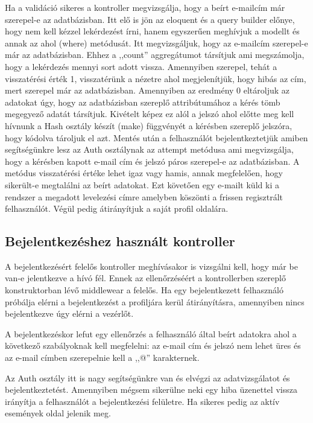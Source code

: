 \documentclass[
]{thesis-ekf}
\theoremstyle{definition}
\theoremstyle{remark}
\begin{document}
Ha a validáció sikeres a kontroller megvizsgálja, hogy a beírt e-mailcím már szerepel-e az adatbázisban. Itt elő is jön az eloquent és a query builder előnye, hogy nem kell kézzel lekérdezést írni, hanem egyszerűen meghívjuk a modellt és annak az ahol (where) metódusát. Itt megvizsgáljuk, hogy az e-mailcím szerepel-e már az adatbázisban. Ehhez a ,,count'' aggregátumot társítjuk ami megszámolja, hogy a lekérdezés mennyi sort adott vissza. Amennyiben szerepel, tehát a visszatérési érték 1, visszatérünk a nézetre ahol megjelenítjük, hogy hibás az cím, mert szerepel már az adatbázisban. Amennyiben az eredmény 0 eltároljuk az adatokat úgy, hogy az adatbázisban szereplő attribútumához a kérés tömb megegyező adatát társítjuk. Kivételt képez ez alól a jelszó ahol előtte meg kell hívnunk a Hash osztály készít (make) függvényét a kérésben szereplő jelszóra, hogy kódolva tároljuk el azt. Mentés után a felhasználót bejelentkeztetjük amiben segítségünkre lesz az Auth osztálynak az attempt metódusa ami megvizsgálja, hogy a kérésben kapott e-mail cím és jelszó páros szerepel-e az adatbázisban. A metódus visszatérési értéke lehet igaz vagy hamis, annak megfelelően, hogy sikerült-e megtalálni az beírt adatokat. Ezt követően egy e-mailt küld ki a rendszer a megadott levelezési címre amelyben köszönti a frissen regisztrált felhasználót. Végül pedig átirányítjuk a saját profil oldalára.

\subsection{Bejelentkezéshez használt kontroller}
A bejelentkezésért felelős kontroller meghívásakor is vizsgálni kell, hogy már be van-e jelentkezve a hívó fél. Ennek az ellenőrzéséért a kontrollerben szereplő konstruktorban lévő middlewear a felelős. Ha egy bejelentkezett felhasználó próbálja elérni a bejelentkezést a profiljára kerül átirányításra, amennyiben nincs bejelentkezve úgy elérni a vezérlőt.

A bejelentkezéskor lefut egy ellenőrzés a felhasználó által beírt adatokra ahol a következő szabályoknak kell megfelelni: az e-mail cím és jelszó nem lehet üres és az e-mail címben szerepelnie kell a ,,@'' karakternek.

Az Auth osztály itt is nagy segítségünkre van és elvégzi az adatvizsgálatot és bejelentkeztetést. Amennyiben mégsem sikerülne neki egy hiba üzenettel vissza irányítja a felhasználót a bejelentkezési felületre. Ha sikeres pedig az aktív események oldal jelenik meg.
\end{document}
